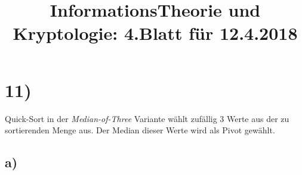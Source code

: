 \documentclass[11pt,a4paper]{article}
\author{}
\begin{document}
  \title{InformationsTheorie und Kryptologie: 4.Blatt für 12.4.2018}
  \maketitle
  
  \section*{11)}
  
    Quick-Sort in der \textit{Median-of-Three} Variante wählt zufällig 3 Werte aus der zu sortierenden Menge aus. Der Median dieser Werte wird als Pivot gewählt.\\
    
    \subsection*{a)}
      
\end{document}
